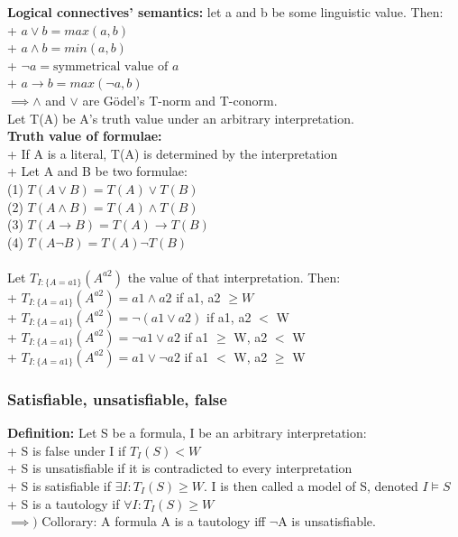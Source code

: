 \documentclass[26pt,fleqn,]{article}
\begin{document}
{\bfseries Logical connectives' semantics:} let a and b be some linguistic value. Then:\\
\indent + \(a \vee b = max(a,b)\)\\
\indent + \(a \wedge b = min(a,b)\)\\
\indent + \(\neg a = \text{symmetrical value of } a\)\\
\indent + \(a \to b = max(\neg a,b)\)\\
\(\implies \wedge\) and \(\vee\) are G{\"o}del's T-norm and T-conorm.\\
Let T(A) be A's truth value under an arbitrary interpretation.\\
{\bfseries Truth value of formulae:}\\
\indent + If A is a literal, T(A) is determined by the interpretation\\
\indent + Let A and B be two formulae:\\
\indent \indent (1) \(T(A\vee B) = T(A) \vee T(B)\)\\
\indent \indent (2) \(T(A\wedge B) = T(A) \wedge T(B)\)\\
\indent \indent (3) \(T(A\to B) = T(A) \to T(B)\)\\
\indent \indent (4) \(T(A\neg B) = T(A) \neg T(B)\)
\\\\
Let \(T_{I:\{A = a1\}}(A^{a2})\) the value of that interpretation. Then:\\
\indent + \(T_{I:\{A = a1\}}(A^{a2}) = a1 \wedge a2 \) if a1, a2 \(\ge W\)\\
\indent + \(T_{I:\{A = a1\}}(A^{a2}) = \neg (a1 \vee a2) \) if a1, a2 \(<\) W\\
\indent + \(T_{I:\{A = a1\}}(A^{a2}) = \neg a1 \vee a2 \) if a1 \(\ge\) W, a2 \(<\) W\\
\indent + \(T_{I:\{A = a1\}}(A^{a2}) =  a1 \vee \neg a2 \) if a1 \(<\) W, a2 \(\ge\) W\\

\subsubsection{Satisfiable, unsatisfiable, false}
{\bfseries Definition:} Let S be a formula, I be an arbitrary interpretation:\\
\indent + S is false under I if \(T_I(S) < W\)\\
\indent + S is unsatisfiable if it is contradicted to every interpretation\\ 
\indent + S is satisfiable if \(\exists I: T_I(S) \ge W\). I is then called a model of S, denoted \(I \models S\)\\
\indent + S is a tautology if \(\forall I: T_I(S) \ge W\)\\
\indent \(\implies)\) Collorary: A formula A is a tautology iff \(\neg\)A is unsatisfiable.
\end{document}
